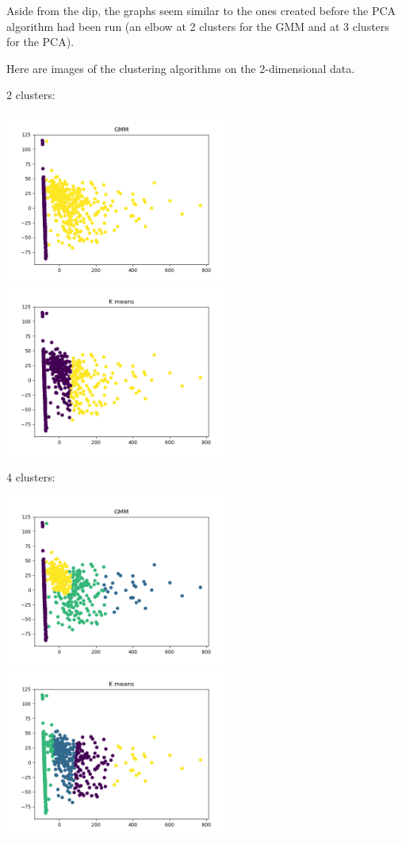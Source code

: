 \documentclass[11pt]{article}
\begin{document}
            Aside from the dip, the graphs seem similar to the ones created before
            the PCA algorithm had been run (an elbow at 2 clusters for the GMM
            and at 3 clusters for the PCA).

            Here are images of the clustering algorithms on the 2-dimensional data.

            2 clusters:

            \includegraphics[width=7.5cm]{../pima/clustering2/cluster_2_gmm_pca.png}
            \includegraphics[width=7.5cm]{../pima/clustering2/cluster_2_km_pca.png}

            4 clusters:

            \includegraphics[width=7.5cm]{../pima/clustering2/cluster_4_gmm_pca.png}
            \includegraphics[width=7.5cm]{../pima/clustering2/cluster_4_km_pca.png}
\end{document}
